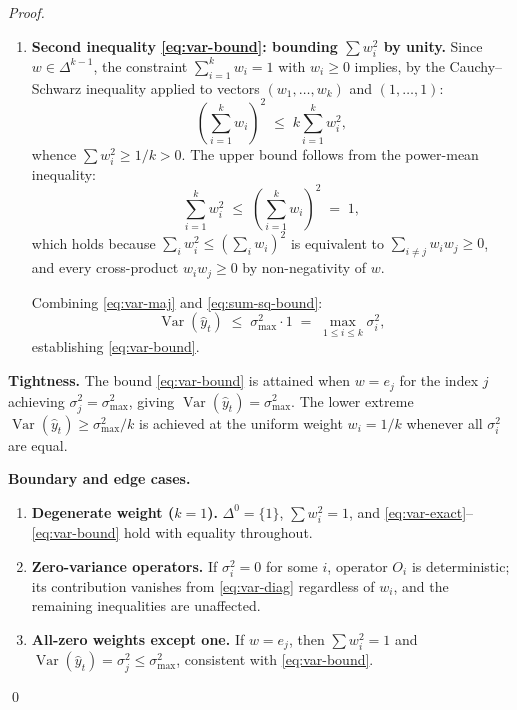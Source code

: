 \documentclass[12pt,openany]{book}
\numberwithin{equation}{chapter}
\theoremstyle{plain}
\theoremstyle{definition}
\theoremstyle{remark}
\numberwithin{equation}{chapter}
\theoremstyle{plain}
\DeclareMathOperator{\Var}{Var}
\begin{document}
\begin{proof}
\begin{enumerate}
  \item \textbf{Second inequality \eqref{eq:var-bound}: bounding
        $\sum w_i^2$ by unity.}
        Since $w \in \Delta^{k-1}$, the constraint $\sum_{i=1}^{k} w_i = 1$
        with $w_i \geq 0$ implies, by the Cauchy--Schwarz inequality
        applied to vectors $(w_1,\ldots,w_k)$ and $(1,\ldots,1)$:
        \begin{equation}
          \left(\sum_{i=1}^{k} w_i\right)^{\!2}
            \;\leq\; k\sum_{i=1}^{k} w_i^2,
        \end{equation}
        whence $\sum w_i^2 \geq 1/k > 0$.  The upper bound follows from
        the power-mean inequality:
        \begin{equation}
          \sum_{i=1}^{k} w_i^2
            \;\leq\;
            \left(\sum_{i=1}^{k} w_i\right)^{\!2}
            \;=\; 1,
          \label{eq:sum-sq-bound}
        \end{equation}
        which holds because
        $\sum_{i}w_i^2 \leq (\sum_i w_i)^2$ is equivalent to
        $\sum_{i\neq j}w_i w_j \geq 0$, and every cross-product
        $w_i w_j \geq 0$ by non-negativity of $w$.

        Combining \eqref{eq:var-maj} and \eqref{eq:sum-sq-bound}:
        \begin{equation}
          \Var(\hat{y}_t)
            \;\leq\;
            \sigma_{\max}^2 \cdot 1
            \;=\; \max_{1 \leq i \leq k}\sigma_i^2,
        \end{equation}
        establishing \eqref{eq:var-bound}.
\end{enumerate}

\noindent\textbf{Tightness.}
The bound \eqref{eq:var-bound} is attained when $w = e_j$ for the index
$j$ achieving $\sigma_j^2 = \sigma_{\max}^2$, giving $\Var(\hat{y}_t) =
\sigma_{\max}^2$.  The lower extreme $\Var(\hat{y}_t) \geq
\sigma_{\max}^2 / k$ is achieved at the uniform weight $w_i = 1/k$
whenever all $\sigma_i^2$ are equal.

\noindent\textbf{Boundary and edge cases.}
\begin{enumerate}
  \item \textbf{Degenerate weight ($k = 1$).}  $\Delta^{0} = \{1\}$,
        $\sum w_i^2 = 1$, and \eqref{eq:var-exact}--\eqref{eq:var-bound}
        hold with equality throughout.
  \item \textbf{Zero-variance operators.}  If $\sigma_i^2 = 0$ for some
        $i$, operator $O_i$ is deterministic; its contribution vanishes
        from \eqref{eq:var-diag} regardless of $w_i$, and the remaining
        inequalities are unaffected.
  \item \textbf{All-zero weights except one.}  If $w = e_j$, then
        $\sum w_i^2 = 1$ and $\Var(\hat{y}_t) = \sigma_j^2 \leq
        \sigma_{\max}^2$, consistent with \eqref{eq:var-bound}.
\end{enumerate}
\qed
\end{proof}
\end{document}
